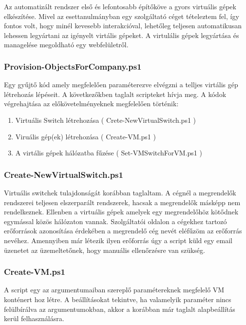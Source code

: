 \documentclass[12pt,oneside,justify,table]{book}
\begin{document}
Az automatizált rendszer első és lefontosabb építőköve a gyors virtuális gépek elkészítése. Mivel az esettanulmányban egy szolgáltató céget tételeztem fel, így fontos volt, hogy minél kevesebb interakcióval, lehetőleg teljesen automatikusan lehessen legyártani az igényelt virtális gépeket. A virtulális gépek legyártása és managelése megoldható egy webfelületről.

\subsubsection{Provision-ObjectsForCompany.ps1}
Egy gyűjtő kód amely megfelelően paraméterezve elvégzni a telljes virtális gép létrehozás lépéseit. 
A következőkben taglalt scripteket hívja meg. 
A kódok végrehajtása az előkövetelményeknek megfelelően történik:
\begin{enumerate}
	\item Virtuális Switch létrehozása ( Crete-NewVirtualSwitch.ps1 )
	\item Viruális gép(ek) létrehozása ( Create-VM.ps1 )
	\item A virtális gépek hálózatba fűzése ( Set-VMSwitchForVM.ps1 )
\end{enumerate}


\subsubsection{Create-NewVirtualSwitch.ps1}

Virtuális switchek tulajdonságát korábban taglaltam. A cégnél a megrendelők rendszerei teljesen elszerparált rendszerek, hacsak a megrendelők másképp nem rendelkeznek. Ellenben a virtuális gépek amelyek egy megrendelőhöz kötődnek egymással közös hálózaton vannak. Szolgáltatói oldalon a cégekhez tartozó erőforrások azonosítása érdekében a megrendelő cég nevét eléfűzöm az erőforrás nevéhez. Amennyiben már létezik ilyen erőforrás úgy a script küld egy email üzenetet az üzemeltetőnek, hogy manuális ellenőrzésre van szükség.


\subsubsection{Create-VM.ps1}

A script egy az argumentumaiban szereplő paramétereknek megfelelő VM konténert hoz létre. A beállításokat tekintve, ha valamelyik paraméter nincs felülbírálva az argumentumokban, akkor a korábban már taglalt alapbeállítás kerül felhasználásra.
\end{document}
